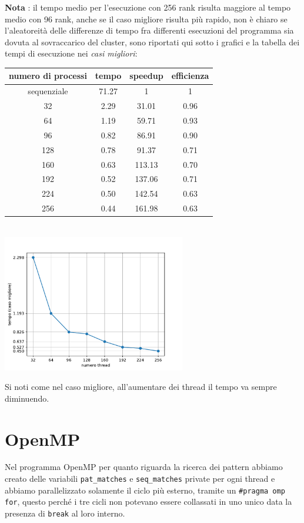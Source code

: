 \documentclass[12pt,openany]{report}
\begin{document}
\textbf{Nota} : il tempo medio per l'esecuzione con 256 rank risulta maggiore al tempo medio con 96 rank, anche se il caso migliore risulta più rapido, non è chiaro se l'aleatoreità delle differenze di tempo fra differenti esecuzioni del programma sia dovuta al sovraccarico del cluster, sono riportati qui sotto i grafici e la tabella dei tempi di esecuzione nei \textit{casi migliori}:
\begin{center}
    \begin{tabular}{|c|c|c|c|}
        \hline
        \rowcolor[HTML]{EFEFEF} 
        numero di processi & tempo& speedup & efficienza  \\ \hline
        sequenziale      & 71.27 & 1 & 1\\ \hline
        32               & 2.29  & 31.01 & 0.96\\ \hline
        64               & 1.19  & 59.71 & 0.93\\ \hline
        96               & 0.82  & 86.91 & 0.90\\ \hline
        128              & 0.78  & 91.37 & 0.71\\ \hline
        160              & 0.63  & 113.13 & 0.70\\ \hline
        192              & 0.52  & 137.06 & 0.71\\ \hline
        224              & 0.50  & 142.54 & 0.63\\ \hline
        256              & 0.44  & 161.98 & 0.63\\ \hline
    \end{tabular}\\ 
    \includegraphics[width=0.6\textwidth ]{images/tempi_MPI_bestcase.pdf}
\end{center}
Si noti come nel caso migliore, all'aumentare dei thread il tempo va sempre diminuendo.



\newpage
\section{OpenMP}
Nel programma OpenMP per quanto riguarda la ricerca dei pattern abbiamo creato delle variabili \texttt{pat\_matches} e \texttt{seq\_matches} private per ogni thread e abbiamo parallelizzato solamente il ciclo più esterno, tramite un \texttt{\#pragma omp for}, questo perché i tre cicli non potevano essere collassati in uno unico data la presenza di \texttt{break} al loro interno.
\bigskip
\end{document}
